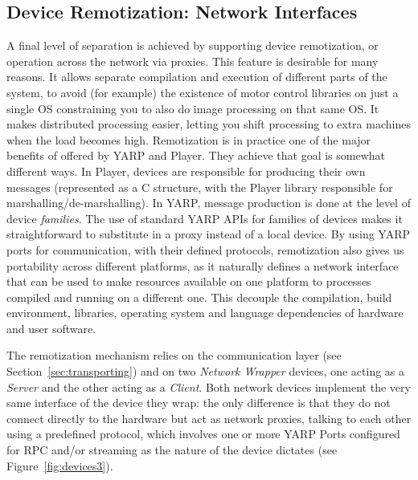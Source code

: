 \subsection{Device Remotization: Network Interfaces}
%
A final level of separation is achieved by supporting device remotization,
or operation across the network via proxies.
This feature is desirable for many reasons. It 
allows separate compilation and
execution of different parts of the system, to avoid (for example)
 the existence of motor control libraries on just a single OS
constraining you to also do image processing on that same OS.
It makes distributed processing easier, letting you shift
processing to extra machines when the load becomes high.
%
Remotization is in practice one of the major benefits of offered by
YARP and Player.  They achieve that goal is somewhat different ways.
In Player, devices are responsible for producing their own messages
(represented as a C structure, with the Player library responsible for
marshalling/de-marshalling).
%
In YARP, message production is done at the level of device {\it families}.
%
The use of standard YARP APIs for families of devices
makes it straightforward to substitute in a proxy
instead of a local device.
%
%
By using YARP ports for communication, with their defined protocols,
remotization also gives us portability across different platforms, as 
it naturally defines a network interface that can 
be used to make resources available on one platform to processes compiled 
and running on a different one. This decouple the compilation, build 
environment, libraries, operating system and language dependencies of 
hardware and user software.

The remotization mechanism relies on the communication layer 
(see Section~\ref{sec:transporting}) and on two 
\emph{Network Wrapper} devices, 
one acting as a \emph{Server} and the other acting as a \emph{Client}. 
Both network devices implement the very same interface of the device 
they wrap: the only difference is that they 
do not connect directly to the hardware but act as network proxies, 
talking to each other using a predefined protocol, which involves one or more 
YARP Ports configured for RPC and/or streaming
as the nature of the device dictates (see Figure~\ref{fig:devices3}).

